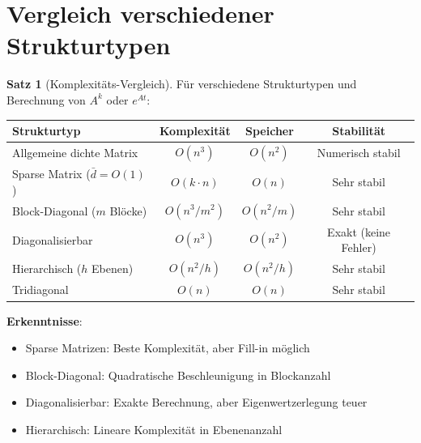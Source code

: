 \documentclass[a4paper,12pt]{report}
\theoremstyle{definition}
\newtheorem{satz}{Satz}
\begin{document}
	\section{Vergleich verschiedener Strukturtypen}
	
	\begin{satz}[Komplexitäts-Vergleich]
		Für verschiedene Strukturtypen und Berechnung von $A^k$ oder $e^{At}$:
		
		\begin{center}
			\begin{tabular}{|l|c|c|c|}
				\hline
				\textbf{Strukturtyp} & \textbf{Komplexität} & \textbf{Speicher} & \textbf{Stabilität} \\
				\hline
				Allgemeine dichte Matrix & $O(n^3)$ & $O(n^2)$ & Numerisch stabil \\
				Sparse Matrix ($\bar{d} = O(1)$) & $O(k \cdot n)$ & $O(n)$ & Sehr stabil \\
				Block-Diagonal ($m$ Blöcke) & $O(n^3/m^2)$ & $O(n^2/m)$ & Sehr stabil \\
				Diagonalisierbar & $O(n^3)$ & $O(n^2)$ & Exakt (keine Fehler) \\
				Hierarchisch ($h$ Ebenen) & $O(n^2/h)$ & $O(n^2/h)$ & Sehr stabil \\
				Tridiagonal & $O(n)$ & $O(n)$ & Sehr stabil \\
				\hline
			\end{tabular}
		\end{center}
		
		\textbf{Erkenntnisse}:
		\begin{itemize}
			\item Sparse Matrizen: Beste Komplexität, aber Fill-in möglich
			\item Block-Diagonal: Quadratische Beschleunigung in Blockanzahl
			\item Diagonalisierbar: Exakte Berechnung, aber Eigenwertzerlegung teuer
			\item Hierarchisch: Lineare Komplexität in Ebenenanzahl
		\end{itemize}
	\end{satz}
	
\end{document}
